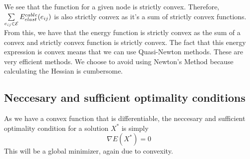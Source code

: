 We see that the function for a given node is strictly convex. Therefore, $\sum\limits_{e_{ij} \in \mathcal{E}} E^{cable}_{elast}(e_{ij})$ is also strictly convex as it's a sum of strictly convex functions. From this, we have that the energy function is strictly convex as the sum of a convex and strictly convex function is strictly convex. The fact that this energy expression is convex means that we can use Quasi-Newton methods. These are very efficient methods. We choose to avoid using Newton's Method because calculating the Hessian is cumbersome.

\subsection{Neccesary and sufficient optimality conditions}
As we have a convex function that is differentiable, the neccesary and sufficient optimality condition for a solution $X^*$ is simply \begin{equation}
    \nabla E(X^*) = 0
\end{equation}
This will be a global minimizer, again due to convexity.